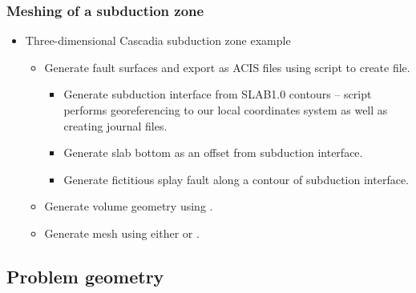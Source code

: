 \documentclass[aspectratio=169]{beamer}
\begin{document}
\begin{frame}
  \frametitle{Meshing of a subduction zone}
  
  \begin{itemize}
  \item Three-dimensional Cascadia subduction zone example\\
    \begin{itemize}
    \item Generate fault surfaces and export as ACIS files using
       script to create
       file.
      \begin{itemize}
      \item Generate subduction interface from SLAB1.0 contours --
        script performs georeferencing to our local coordinates system
        as well as creating journal files.
      \item Generate slab bottom as an offset from subduction interface.
      \item Generate fictitious splay fault along a contour of subduction
        interface.
      \end{itemize}
    \item Generate volume geometry using .
    \item Generate mesh using either  or
      .
    \end{itemize}
  \end{itemize}


\end{frame}


\subsection{Problem geometry}
\end{document}
